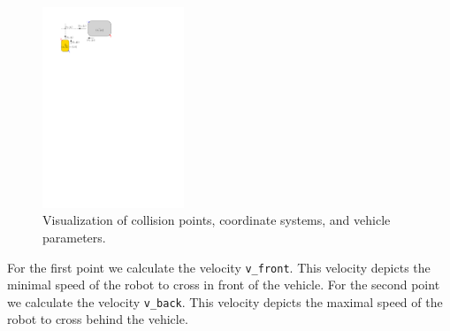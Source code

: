         \begin{figure}[ht]
            \centering
            \includegraphics[height=6cm]{images/collision.pdf}
            \caption{Visualization of collision points, coordinate systems, and vehicle parameters.}
            \label{fig:collision}
        \end{figure}
        \noindent For the first point we calculate the velocity \texttt{v\_front}. This velocity depicts the minimal speed of the robot to cross in front of the vehicle. For the second point we calculate the velocity \texttt{v\_back}. This velocity depicts the maximal speed of the robot to cross behind the vehicle.\\
